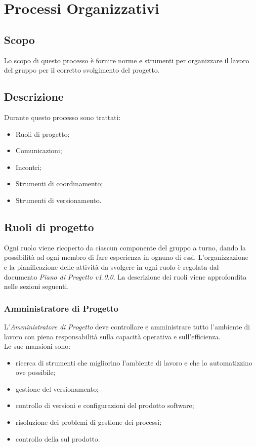 \documentclass[../NormediProgetto.tex]{subfiles}
\begin{document}
	
	\chapter{Processi Organizzativi}
	
	\section{Scopo}
	Lo scopo di questo processo è fornire norme e strumenti per organizzare il lavoro del gruppo per il corretto svolgimento del progetto.
	
	\section {Descrizione}
	Durante questo processo sono trattati:
	\begin{itemize}
		\item Ruoli di progetto;
		\item Comunicazioni;
		\item Incontri;
		\item Strumenti di coordinamento;
		\item Strumenti di versionamento.
		
	\end{itemize}
	
	\section {Ruoli di progetto}
	
	Ogni ruolo viene ricoperto da ciascun componente del gruppo a turno, dando la possibilità ad ogni membro di fare esperienza in ognuno di essi. L'organizzazione e la pianificazione delle attività da svolgere in ogni ruolo è regolata dal documento \textit{Piano di Progetto v1.0.0}. La descrizione dei ruoli viene approfondita nelle sezioni seguenti.
	
	\subsection {Amministratore di Progetto}
	
	L’\textit{Amministratore di Progetto} deve controllare e amministrare tutto l’ambiente di lavoro con piena responsabilità sulla capacità operativa e sull’efficienza. 
	\\ \noindent Le sue mansioni sono: 
	
	\begin{itemize}
		\item ricerca di strumenti che migliorino l’ambiente di lavoro e che lo automatizzino ove possibile;
		\item gestione del versionamento;
		\item controllo di versioni e configurazioni del prodotto software; 
		\item risoluzione dei problemi di gestione dei processi; 
		\item controllo della  sul prodotto.
	\end{itemize}
	
\end{document}
